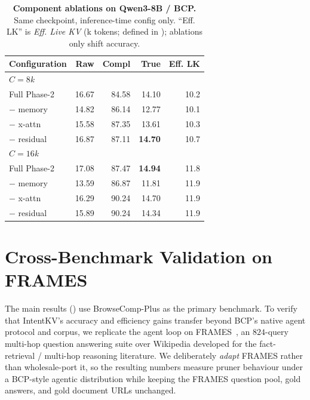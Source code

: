 \documentclass[11pt]{article}
\newcommand{\method}{IntentKV\xspace}
\newcommand{\learn}{Phase-2\xspace}
\begin{document}
\begin{table}[!htbp]
\centering
\footnotesize
\caption{\textbf{Component ablations on Qwen3-8B / BCP.} Same
checkpoint, inference-time config only. ``Eff. LK'' is
\emph{Eff. Live KV} (k tokens; defined in
); ablations only shift accuracy.}
\label{tab:abl-components}
\setlength{\tabcolsep}{4pt}
\begin{tabular*}{\columnwidth}{@{\extracolsep{\fill}} lrrrr}
\toprule
Configuration & Raw & Compl & True & Eff. LK \\
\midrule
\multicolumn{5}{l}{\emph{$C{=}8$k}} \\
Full \learn  & 16.67 & 84.58 & 14.10 & 10.2 \\
$-$ memory   & 14.82 & 86.14 & 12.77 & 10.1 \\
$-$ x-attn   & 15.58 & 87.35 & 13.61 & 10.3 \\
$-$ residual & 16.87 & 87.11 & \textbf{14.70} & 10.7 \\
\midrule
\multicolumn{5}{l}{\emph{$C{=}16$k}} \\
Full \learn  & 17.08 & 87.47 & \textbf{14.94} & 11.8 \\
$-$ memory   & 13.59 & 86.87 & 11.81 & 11.9 \\
$-$ x-attn   & 16.29 & 90.24 & 14.70 & 11.9 \\
$-$ residual & 15.89 & 90.24 & 14.34 & 11.9 \\
\bottomrule
\end{tabular*}
\end{table}

\section{Cross-Benchmark Validation on FRAMES}
\label{appendix:frames-validation}

The main results ()
use BrowseComp-Plus as the primary benchmark. To verify that
\method's accuracy and efficiency gains transfer beyond BCP's native
agent protocol and corpus, we replicate the agent loop on
FRAMES~\citep{krishna2024fact}, an $824$-query multi-hop question
answering suite over Wikipedia developed for the
fact-retrieval / multi-hop reasoning literature. We deliberately
\emph{adapt} FRAMES rather than wholesale-port it, so the resulting
numbers measure pruner behaviour under a BCP-style agentic
distribution while keeping the FRAMES question pool, gold answers,
and gold document URLs unchanged.
\end{document}
